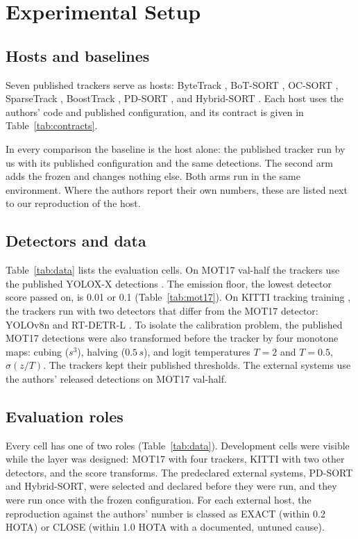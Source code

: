 \section{Experimental Setup}\label{sec:setup}

\subsection{Hosts and baselines}\label{sec:hosts}
Seven published trackers serve as hosts: ByteTrack \cite{zhang2022bytetrack},
BoT-SORT \cite{aharon2022botsort}, OC-SORT \cite{cao2023ocsort}, SparseTrack
\cite{liu2025sparsetrack}, BoostTrack \cite{stanojevic2024boosttrack},
PD-SORT \cite{wang2025pdsort}, and Hybrid-SORT \cite{yang2024hybridsort}.
Each host uses the authors' code and published configuration,
and its contract is given in Table~\ref{tab:contracts}.

In every comparison the baseline is the host alone: the published tracker run
by us with its published configuration and the same detections. The second
arm adds the frozen \scl{} and changes nothing else. Both arms run in the same
environment. Where the authors report their own numbers, these are listed
next to our reproduction of the host.

\subsection{Detectors and data}\label{sec:data}
Table~\ref{tab:data} lists the evaluation cells. On MOT17 val-half
\cite{milan2016mot16} the trackers use the published YOLOX-X detections
\cite{ge2021yolox}. The emission floor, the lowest detector score passed on,
is 0.01 or 0.1 (Table~\ref{tab:mot17}). On KITTI tracking training \cite{geiger2012kitti}, the trackers run
with two detectors that differ from the MOT17 detector: YOLOv8n
\cite{jocher2023yolov8} and RT-DETR-L \cite{zhao2024rtdetr}. To isolate the
calibration problem, the published MOT17 detections were also transformed
before the tracker by four monotone maps: cubing ($s^3$), halving ($0.5\,s$),
and logit temperatures $T=2$ and $T=0.5$, $\sigma(z/T)$. The trackers kept
their published thresholds. The external systems use the authors' released
detections on MOT17 val-half.



\subsection{Evaluation roles}\label{sec:roles}
Every cell has one of two roles (Table~\ref{tab:data}). Development cells
were visible while the layer was designed: MOT17 with four trackers, KITTI
with two other detectors, and the score transforms. The predeclared external
systems, PD-SORT and Hybrid-SORT, were selected and declared before they were
run, and they were run once with the frozen configuration. For each external
host, the reproduction against the authors' number is classed as EXACT
(within 0.2 HOTA) or CLOSE (within 1.0 HOTA with a documented, untuned
cause).

